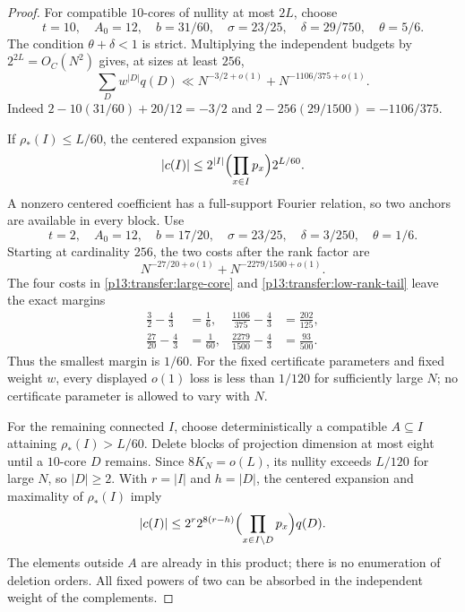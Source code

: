 \begin{proof}
For compatible $10$-cores of nullity at most $2L$, choose
\[
 t=10,\quad A_0=12,\quad b=31/60,\quad
 \sigma=23/25,\quad\delta=29/750,\quad\theta=5/6.
\]
The condition $\theta+\delta<1$ is strict. Multiplying the independent
budgets by $2^{2L}=O_C(N^2)$ gives, at sizes at least $256$,
\begin{equation}
 \sum_D w^{|D|}q(D)
 \ll N^{-3/2+o(1)}+N^{-1106/375+o(1)}.
 \label{p13:transfer:large-core}
\end{equation}
Indeed $2-10(31/60)+20/12=-3/2$ and
$2-256(29/1500)=-1106/375$.

If $\rho_*(I)\leq L/60$, the centered expansion gives
\[
 |c(I)|\leq2^{|I|}\Bigl(\prod_{x\in I}p_x\Bigr)2^{L/60}.
\]
A nonzero centered coefficient has a full-support Fourier relation,
so two anchors are available in every block. Use
\[
 t=2,\quad A_0=12,\quad b=17/20,\quad
 \sigma=23/25,\quad\delta=3/250,\quad\theta=1/6.
\]
Starting at cardinality $256$, the two costs after the rank factor are
\begin{equation}
 N^{-27/20+o(1)}+N^{-2279/1500+o(1)}.
 \label{p13:transfer:low-rank-tail}
\end{equation}
The four costs in \eqref{p13:transfer:large-core} and
\eqref{p13:transfer:low-rank-tail} leave the exact margins
\[
 \begin{aligned}
 \frac32-\frac43&=\frac16,&
 \frac{1106}{375}-\frac43&=\frac{202}{125},\\
 \frac{27}{20}-\frac43&=\frac1{60},&
 \frac{2279}{1500}-\frac43&=\frac{93}{500}.
 \end{aligned}
\]
Thus the smallest margin is $1/60$. For the fixed certificate parameters
and fixed weight $w$, every displayed $o(1)$ loss is less than $1/120$
for sufficiently large $N$; no certificate parameter is allowed to vary
with $N$.

For the remaining connected $I$, choose deterministically a compatible
$A\subseteq I$ attaining $\rho_*(I)>L/60$. Delete blocks of projection
dimension at most eight until a $10$-core $D$ remains. Since
$8K_N=o(L)$, its nullity exceeds $L/120$ for large $N$, so $|D|\geq2$.
With $r=|I|$ and $h=|D|$, the centered expansion and maximality of
$\rho_*(I)$ imply
\begin{equation}
 |c(I)|\leq2^r2^{8(r-h)}
               \Bigl(\prod_{x\in I\setminus D}p_x\Bigr)q(D).
 \label{p13:transfer:peeling}
\end{equation}
The elements outside $A$ are already in this product; there is no
enumeration of deletion orders. All fixed powers of two can be absorbed
in the independent weight of the complements.


\end{proof}
